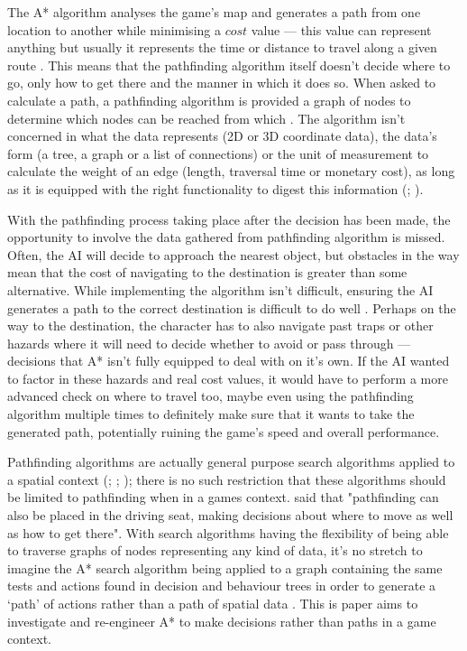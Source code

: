 \documentclass[11pt, a4paper]{report}
\begin{document}
The A* algorithm analyses the game's map and generates a path from one location to another while minimising a $cost$ value --- this value can represent anything but usually it represents the time or distance to travel along a given route \parencite[44]{yap2002grid}. This means that the pathfinding algorithm itself doesn't decide where to go, only how to get there and the manner in which it does so. When asked to calculate a path, a pathfinding algorithm is provided a graph of nodes to determine which nodes can be reached from which \parencite[61]{nareyek2004ai}. The algorithm isn't concerned in what the data represents (2D or 3D coordinate data), the data's form (a tree, a graph or a list of connections) or the unit of measurement to calculate the weight of an edge (length, traversal time or monetary cost), as long as it is equipped with the right functionality to digest this information (\cite[277]{millington2019ai}; \cite[60]{graham2003pathfinding}).

With the pathfinding process taking place after the decision has been made, the opportunity to involve the data gathered from pathfinding algorithm is missed. Often, the AI will decide to approach the nearest object, but obstacles in the way mean that the cost of navigating to the destination is greater than some alternative. While implementing the algorithm isn't difficult, ensuring the AI generates a path to the correct destination is difficult to do well \parencite{forbus2002qualitative}. Perhaps on the way to the destination, the character has to also navigate past traps or other hazards where it will need to decide whether to avoid or pass through --- decisions that A* isn't fully equipped to deal with on it's own. If the AI wanted to factor in these hazards and real cost values, it would have to perform a more advanced check on where to travel too, maybe even using the pathfinding algorithm multiple times to definitely make sure that it wants to take the generated path, potentially ruining the game's speed and overall performance.

Pathfinding algorithms are actually general purpose search algorithms applied to a spatial context (\cite[125]{cui2011based}; \cite[6]{orkin2003applying}; \cite[46]{yap2002grid}); there is no such restriction that these algorithms should be limited to pathfinding when in a games context. \citeauthor{millington2019ai} \parencite*[197]{millington2019ai} said that "pathfinding can also be placed in the driving seat, making decisions about where to move as well as how to get there". With search algorithms having the flexibility of being able to traverse graphs of nodes representing any kind of data, it's no stretch to imagine the A* search algorithm being applied to a graph containing the same tests and actions found in decision and behaviour trees in order to generate a `path' of actions rather than a path of spatial data \parencite[114]{higgins2002generic}. This is paper aims to investigate and re-engineer A* to make decisions rather than paths in a game context.
\end{document}

